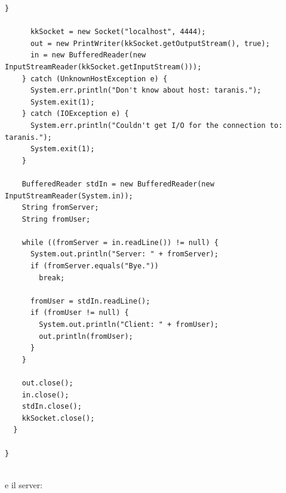 \documentclass[a4paper,12pt, oneside]{book}
\begin{document}
\begin{verbatim}
}

      kkSocket = new Socket("localhost", 4444);
      out = new PrintWriter(kkSocket.getOutputStream(), true);
      in = new BufferedReader(new InputStreamReader(kkSocket.getInputStream()));
    } catch (UnknownHostException e) {
      System.err.println("Don't know about host: taranis.");
      System.exit(1);
    } catch (IOException e) {
      System.err.println("Couldn't get I/O for the connection to: taranis.");
      System.exit(1);
    }

    BufferedReader stdIn = new BufferedReader(new InputStreamReader(System.in));
    String fromServer;
    String fromUser;

    while ((fromServer = in.readLine()) != null) {
      System.out.println("Server: " + fromServer);
      if (fromServer.equals("Bye."))
        break;

      fromUser = stdIn.readLine();
      if (fromUser != null) {
        System.out.println("Client: " + fromUser);
        out.println(fromUser);
      }
    }

    out.close();
    in.close();
    stdIn.close();
    kkSocket.close();
  }

}


\end{verbatim}
e il server:
\end{document}
